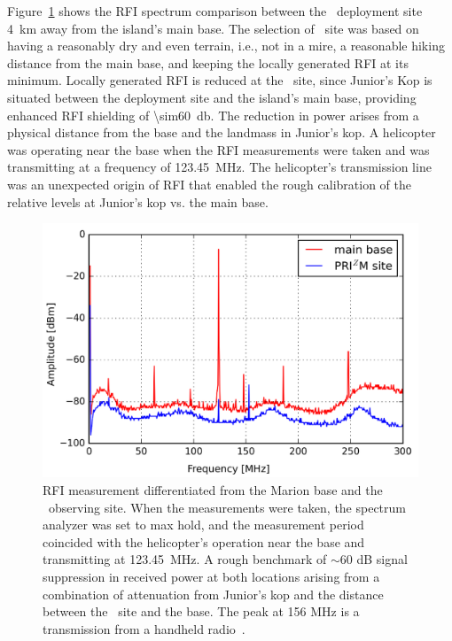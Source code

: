 Figure~\ref{fig:rfi} shows the RFI spectrum comparison between the \prizm\ deployment site \SI{4}{\kilo\metre} away from the island's main base. The selection of \prizm\ site was based on having a reasonably dry and even terrain, i.e., not in a mire, a reasonable hiking distance from the main base, and keeping the locally generated RFI at its minimum. Locally generated RFI is reduced at the \prizm\ site, since Junior's Kop is situated between the deployment site and the island's main base, providing enhanced RFI shielding of \SI{\sim60}{\decibel}. The reduction in power arises from a physical distance from the base and the landmass in Junior's kop. A helicopter was operating near the base when the RFI measurements were taken and was transmitting at a frequency of \SI{123.45}{\mega\hertz}. The helicopter's transmission line was an unexpected origin of RFI that enabled the rough calibration of the relative levels at Junior's kop vs. the main base.

\begin{figure}
	\centering
	\includegraphics[width=\linewidth]{Figures/rfi}
	\caption{RFI measurement differentiated from the Marion base and the \prizm\ observing site. When the measurements were taken, the spectrum analyzer was set to max hold, and the measurement period coincided with the helicopter's operation near the base and transmitting at \SI{123.45}{\mega\hertz}. A rough benchmark of $\sim$60 dB signal suppression in received power at both locations arising from a combination of attenuation from Junior's kop and the distance between the \prizm\ site and the base. The peak at 156 MHz is a transmission from a handheld radio~\citep{2019JAI.....850004P}.}
	\label{fig:rfi}
\end{figure}

